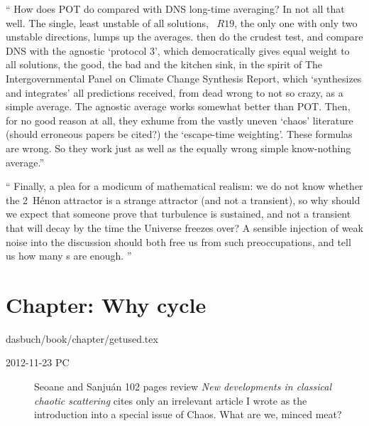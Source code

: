 \begin{description}
``
How does POT do compared with DNS long-time averaging? In
\cite{ChaKer12} not all that well. The single, least unstable of all
solutions, \recFlow\ $R19$, the only one with only two unstable
directions, lumps up the averages. \cite{ChaKer12} then do the
crudest test, and compare DNS with the agnostic `protocol 3', which
democratically gives equal weight to all solutions, the good, the
bad and the kitchen sink, in the spirit of The Intergovernmental
Panel on Climate Change Synthesis Report, which `synthesizes and
integrates' all predictions received, from dead wrong to not so
crazy, as a simple average. The agnostic average works somewhat
better than POT. Then, for no good reason at all, they exhume from
the vastly uneven `chaos' literature (should erroneous papers be
cited?) the `escape-time weighting'. These formulas are wrong. So
they work just as well as the equally wrong simple know-nothing
average.''

``
Finally, a plea for a modicum of mathematical realism: we do not know
whether the 2\dmn\ H\'enon attractor is a strange attractor (and not
a transient), so why should we expect that someone prove that
turbulence is sustained, and not a transient that will decay by the
time the Universe freezes over? A sensible injection of weak noise
into the discussion should both free us from such preoccupations, and
tell us how many \recFlow s are enough.
''

\end{description}

%

\section{Chapter: Why cycle}
\label{c-getused}\noindent dasbuch/book/chapter/getused.tex

\begin{description}

\item[2012-11-23 PC] Seoane and Sanju\'an
{102 pages review} {\em New developments in classical chaotic scattering}
cites only an irrelevant article I wrote as the
introduction into a special issue of Chaos. What are we, minced meat?

\end{description}


